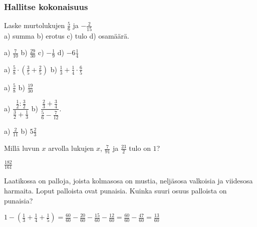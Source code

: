 \begin{tehtavasivu}
\subsubsection*{Hallitse kokonaisuus}

\begin{tehtava}
Laske murtolukujen $\frac{5}{6}$ ja $-\frac{2}{15}$ \\ a) summa \qquad b) erotus \qquad c) tulo \qquad d) osamäärä.
\begin{vastaus}
a) $\frac{7}{10}$ \qquad b) $\frac{29}{30}$ \qquad c) $-\frac{1}{9}$ \qquad d) $-6\frac{1}{4}$
\end{vastaus}
\end{tehtava}

\begin{tehtava}
a) $\frac{5}{8}\cdot(\frac{3}{5}+\frac{2}{5})$ \qquad b) $\frac{1}{3}+\frac{1}{4}\cdot\frac{6}{5}$
\begin{vastaus}
a) $\frac{5}{8}$ \qquad b) $\frac{19}{30}$
\end{vastaus}
\end{tehtava}

\begin{tehtava}
a) $\dfrac{\frac{1}{2}:\frac{3}{2}}{\frac{3}{2}+\frac{1}{3}}$ \qquad b) $\dfrac{\frac{2}{3}+\frac{3}{4}}{\frac{5}{6}-\frac{7}{12}}$.
\begin{vastaus}
a) $\frac{2}{11}$ \qquad b) $5\frac{2}{3}$
\end{vastaus}
\end{tehtava}

\begin{tehtava}
Millä luvun $x$ arvolla lukujen $x$, $\frac{7}{91}$ ja $\frac{23}{2}$ tulo on $1$?
\begin{vastaus}
$\frac{182}{161}$
\end{vastaus}
\end{tehtava}

\begin{tehtava} 
        Laatikossa on palloja, joista kolmasosa on mustia, neljäsosa
        valkoisia ja viidesosa harmaita. Loput palloista ovat 		 	punaisia.
        Kuinka suuri osuus palloista on punaisia?
        
        \begin{vastaus}
            $1-(\frac{1}{3}+\frac{1}{4}+\frac{1}{5})
            = \frac{60}{60}-\frac{20}{60}-\frac{15}{60}-\frac{12}{60}
            = \frac{60}{60}-\frac{47}{60}
            = \frac{13}{60}$
        \end{vastaus}
    \end{tehtava}


\end{tehtavasivu}
